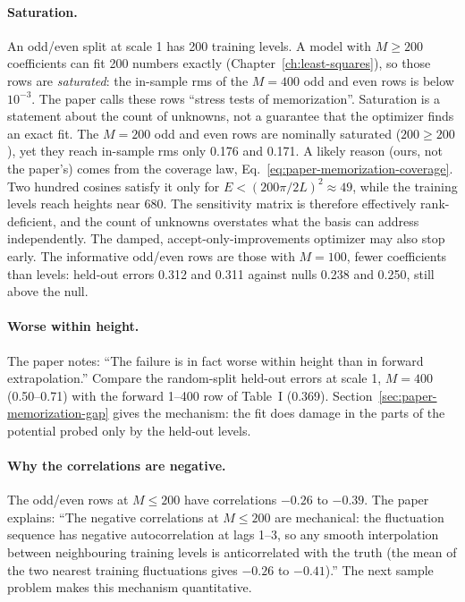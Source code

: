 \paragraph{Saturation.} An odd/even split at scale 1 has 200 training levels. A model with $M\ge200$ coefficients can fit 200 numbers exactly (Chapter~\ref{ch:least-squares}), so those rows are \emph{saturated}: the in-sample rms of the $M=400$ odd and even rows is below $10^{-3}$. The paper calls these rows ``stress tests of memorization''. Saturation is a statement about the count of unknowns, not a guarantee that the optimizer finds an exact fit. The $M=200$ odd and even rows are nominally saturated ($200\ge200$), yet they reach in-sample rms only 0.176 and 0.171. A likely reason (ours, not the paper's) comes from the coverage law, Eq.~\eqref{eq:paper-memorization-coverage}. Two hundred cosines satisfy it only for $E<(200\pi/2L)^2\approx49$, while the training levels reach heights near 680. The sensitivity matrix is therefore effectively rank-deficient, and the count of unknowns overstates what the basis can address independently. The damped, accept-only-improvements optimizer may also stop early. The informative odd/even rows are those with $M=100$, fewer coefficients than levels: held-out errors 0.312 and 0.311 against nulls 0.238 and 0.250, still above the null.

\paragraph{Worse within height.} The paper notes: ``The failure is in fact worse within height than in forward extrapolation.'' Compare the random-split held-out errors at scale 1, $M=400$ (0.50--0.71) with the forward 1--400 row of Table~I (0.369). Section~\ref{sec:paper-memorization-gap} gives the mechanism: the fit does damage in the parts of the potential probed only by the held-out levels.

\paragraph{Why the correlations are negative.} The odd/even rows at $M\le200$ have correlations $-0.26$ to $-0.39$. The paper explains: ``The negative correlations at $M\le200$ are mechanical: the fluctuation sequence has negative autocorrelation at lags 1--3, so any smooth interpolation between neighbouring training levels is anticorrelated with the truth (the mean of the two nearest training fluctuations gives $-0.26$ to $-0.41$).'' The next sample problem makes this mechanism quantitative.

